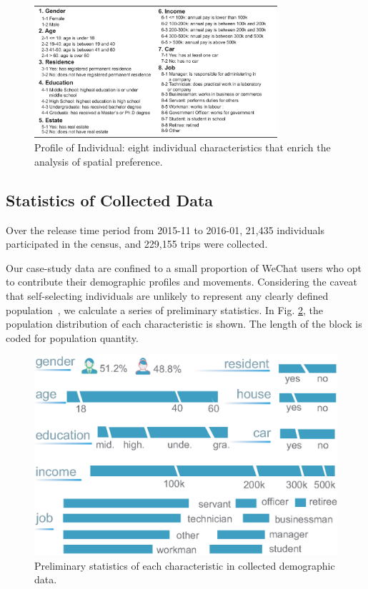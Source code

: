 \documentclass{ieeeaccess}
\begin{document}
\begin{figure}
 \centering
 \includegraphics[width=9cm]{pictures/data_over}
 \captionsetup{justification=centering}
 \caption{Profile of Individual: eight individual characteristics that enrich the analysis of spatial preference.}
 \label{fig:data_over}
\end{figure}



\subsection{Statistics of Collected Data}

Over the release time period from 2015-11 to 2016-01, 21,435 individuals participated in the census, and 229,155 trips were collected.

Our case-study data are confined to a small proportion of WeChat users who opt to contribute their demographic profiles and movements. Considering the caveat that self-selecting individuals are unlikely to represent any clearly defined population~\cite{Longley2015}, we calculate a series of preliminary statistics. In Fig. \ref{fig:data_overview}, the population distribution of each characteristic is shown. The length of the block is coded for population quantity.

\begin{figure}[htb!]
 \centering %
 \includegraphics[width=\columnwidth]{pictures/data_overview}
 \caption{Preliminary statistics of each characteristic in collected demographic data.}
 \label{fig:data_overview}
\end{figure}
\end{document}
